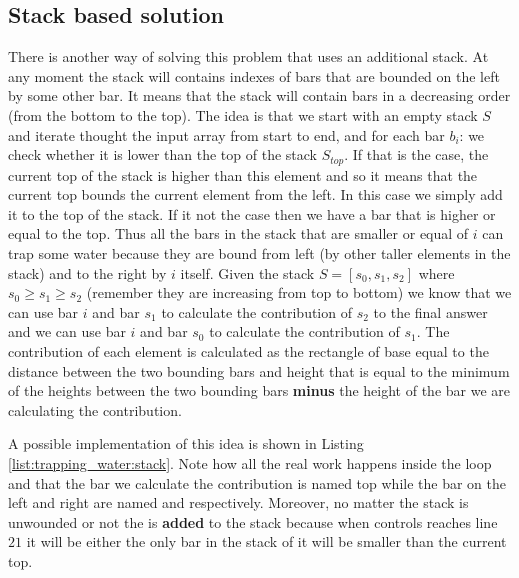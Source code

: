 \subsection{Stack based solution}
\label{trapping_water:sec:stack}
There is another way of solving this problem that uses an additional stack. At any moment the stack will contains indexes of bars that are bounded on the left by some other bar. It means that the stack will contain bars in a decreasing order (from the bottom to the top). The idea is that we start with an empty stack $S$ and iterate thought the input array from start to end, and for each bar $b_i$:
we check whether it is lower than the top of the stack $S_{top}$. If that is the case, the current top of the stack is higher than this element and so it means that the current top bounds the current element from the left. In this case we simply add it to the  top of the stack. If it not the case then we have a bar that is higher or equal to the top. Thus  all the bars in the stack that are smaller or equal of $i$ can trap some water because they are bound from left (by other taller elements in the stack) and to the right by $i$ itself.
Given the stack $S=[s_0, s_1,s_2]$ where $s_0 \geq s_1 \geq s_2$ (remember they are increasing from top to bottom) we know that we can use bar $i$ and bar $s_1$ to calculate the contribution of $s_2$ to the final answer and we can use bar $i$ and bar $s_0$ to calculate the contribution of $s_1$. The contribution of each element is calculated as the rectangle of base equal to the distance between the two bounding bars and height that is equal to the minimum of the heights between the two bounding bars \textbf{minus} the height of the bar we are calculating the contribution. 

A possible implementation of this idea is shown in Listing \ref{list:trapping_water:stack}. Note how all the real work happens inside the  loop and that the bar we calculate the contribution is named top while the bar on the left and right are named  and  respectively. Moreover, no matter the stack is unwounded or not the  is \textbf{added} to the stack because when controls reaches line $21$ it will be either the only bar in the stack of it will be smaller than the current top.


